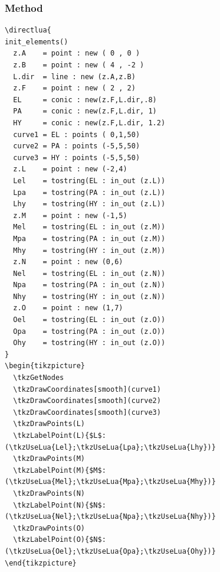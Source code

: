 
\subsubsection{Method } %
\label{ssub:method_imeth_conic_in_out}

\begin{minipage}{.5\textwidth}
\begin{Verbatim}
\directlua{
init_elements()
  z.A    = point : new ( 0 , 0 )
  z.B    = point : new ( 4 , -2 )
  L.dir  = line : new (z.A,z.B)
  z.F    = point : new ( 2 , 2)
  EL     = conic : new(z.F,L.dir,.8)
  PA     = conic : new(z.F,L.dir, 1)
  HY     = conic : new(z.F,L.dir, 1.2)
  curve1 = EL : points ( 0,1,50)
  curve2 = PA : points (-5,5,50)
  curve3 = HY : points (-5,5,50)
  z.L    = point : new (-2,4)
  Lel    = tostring(EL : in_out (z.L))
  Lpa    = tostring(PA : in_out (z.L))
  Lhy    = tostring(HY : in_out (z.L))
  z.M    = point : new (-1,5)
  Mel    = tostring(EL : in_out (z.M))
  Mpa    = tostring(PA : in_out (z.M))
  Mhy    = tostring(HY : in_out (z.M))
  z.N    = point : new (0,6)
  Nel    = tostring(EL : in_out (z.N))
  Npa    = tostring(PA : in_out (z.N))
  Nhy    = tostring(HY : in_out (z.N))
  z.O    = point : new (1,7)
  Oel    = tostring(EL : in_out (z.O))
  Opa    = tostring(PA : in_out (z.O))
  Ohy    = tostring(HY : in_out (z.O))
}
\begin{tikzpicture}
  \tkzGetNodes
  \tkzDrawCoordinates[smooth](curve1)
  \tkzDrawCoordinates[smooth](curve2)
  \tkzDrawCoordinates[smooth](curve3)
  \tkzDrawPoints(L)
  \tkzLabelPoint(L){$L$:(\tkzUseLua{Lel};\tkzUseLua{Lpa};\tkzUseLua{Lhy})}
  \tkzDrawPoints(M)
  \tkzLabelPoint(M){$M$:(\tkzUseLua{Mel};\tkzUseLua{Mpa};\tkzUseLua{Mhy})}
  \tkzDrawPoints(N)
  \tkzLabelPoint(N){$N$:(\tkzUseLua{Nel};\tkzUseLua{Npa};\tkzUseLua{Nhy})}
  \tkzDrawPoints(O)
  \tkzLabelPoint(O){$N$:(\tkzUseLua{Oel};\tkzUseLua{Opa};\tkzUseLua{Ohy})}
\end{tikzpicture}
\end{Verbatim}
\end{minipage}
